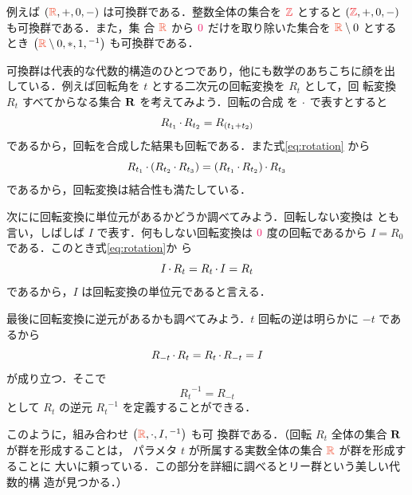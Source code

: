\documentclass[a5paper,twoside,fleqn,draft]{jsbook}
\begin{document}
例えば $\hSingleTuppleWith{\mRSet,+,0,-}$ は可換群である．整数全体の集合を
$\hSet{Z}$ とすると $\hSingleTuppleWith{\hSet{Z},+,0,-}$ も可換群である．また，集
合 $\mRSet$ から $\hConstant{0}$ だけを取り除いた集合を $\mRSet\setminus0$ とする
とき $\hSingleTuppleWith{\mRSet\setminus0,*,1,{}^{-1}}$ も可換群である．

可換群は代表的な代数的構造のひとつであり，他にも数学のあちこちに顔を出
している．例えば回転角を $t$ とする二次元の回転変換を $R_t$ として，回
転変換 $R_t$ すべてからなる集合 $\mathbf{R}$ を考えてみよう．回転の合成
を $\operatorname{\cdot}$ で表すとすると
\begin{equation}
\label{eq:rotation}
R_{t_1}\operatorname{\cdot} R_{t_2}=R_{(t_1+t_2)}
\end{equation}
であるから，回転を合成した結果も回転である．また式\eqref{eq:rotation}
から
\begin{equation}
  R_{t_1}\operatorname{\cdot}\left(R_{t_2}\operatorname{\cdot} R_{t_3}\right)
  =\left(R_{t_1}\operatorname{\cdot} R_{t_2}\right)\operatorname{\cdot} R_{t_3}
\end{equation}
であるから，回転変換は結合性も満たしている．

次にに回転変換に単位元があるかどうか調べてみよう．回転しない変換は
とも言い，しばしば $I$ で表す．何もしない回転変換は
$\hConstant{0}$ 度の回転であるから $I=R_0$ である．このとき式\eqref{eq:rotation}か
ら
\begin{equation}
I\operatorname{\cdot} R_t=R_t\operatorname{\cdot} I=R_t
\end{equation}
であるから，$I$ は回転変換の単位元であると言える．

最後に回転変換に逆元があるかも調べてみよう．$t$ 回転の逆は明らかに
$-t$ であるから
\begin{equation}
R_{-t}\operatorname{\cdot} R_t=R_t\operatorname{\cdot} R_{-t}=I
\end{equation}
が成り立つ．そこで
\begin{equation}
{R_t}^{-1}=R_{-t}
\end{equation}
として $R_t$ の逆元 ${R_t}^{-1}$ を定義することができる．

このように，組み合わせ $\hSingleTuppleWith{\mRSet,\mCompRot,I,{}^{-1}}$ も可
換群である．（回転 $R_t$ 全体の集合 $\mathbf{R}$ が群を形成することは，
パラメタ $t$ が所属する実数全体の集合 $\mRSet$ が群を形成することに
大いに頼っている．この部分を詳細に調べるとリー群という美しい代数的構
造が見つかる．）
\end{document}
